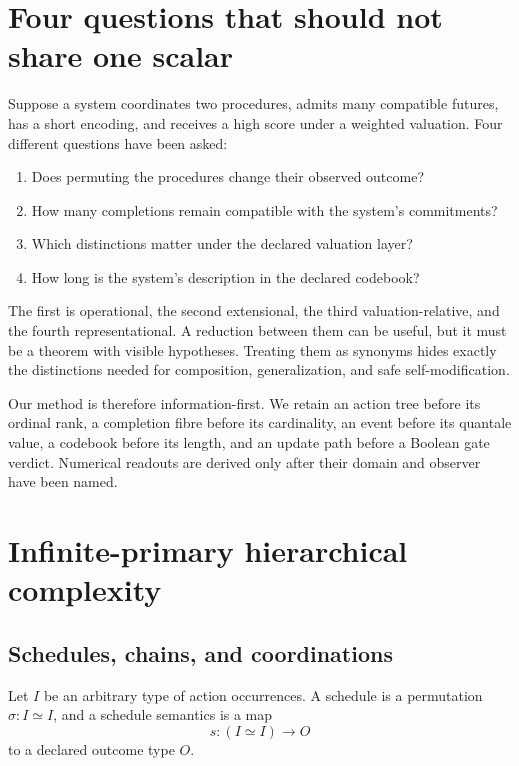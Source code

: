 \documentclass[11pt]{article}
\theoremstyle{remark}
\begin{document}
\section{Four questions that should not share one scalar}

Suppose a system coordinates two procedures, admits many compatible futures,
has a short encoding, and receives a high score under a weighted valuation.
Four different questions have been asked:

\begin{enumerate}[label=(\arabic*)]
  \item Does permuting the procedures change their observed outcome?
  \item How many completions remain compatible with the system's commitments?
  \item Which distinctions matter under the declared valuation layer?
  \item How long is the system's description in the declared codebook?
\end{enumerate}

The first is operational, the second extensional, the third valuation-relative,
and the fourth representational.  A reduction between them can be useful, but
it must be a theorem with visible hypotheses.  Treating them as synonyms hides
exactly the distinctions needed for composition, generalization, and safe
self-modification.

Our method is therefore information-first.  We retain an action tree before
its ordinal rank, a completion fibre before its cardinality, an event before
its quantale value, a codebook before its length, and an update path before a
Boolean gate verdict.  Numerical readouts are derived only after their domain
and observer have been named.

\section{Infinite-primary hierarchical complexity}

\subsection{Schedules, chains, and coordinations}

Let $I$ be an arbitrary type of action occurrences.  A schedule is a
permutation $\sigma : I \simeq I$, and a schedule semantics is a map
\[
  s : (I\simeq I) \longrightarrow O
\]
to a declared outcome type $O$.
\end{document}
